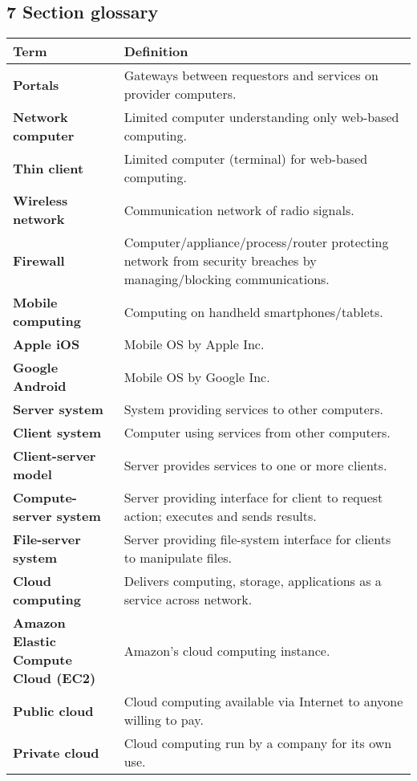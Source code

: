 \documentclass{article}
\begin{document}
\subsection*{7 Section glossary}
\centering
\begin{tabular}{>{\raggedright}p{} >{\raggedright\arraybackslash}p{}}
\toprule
\textbf{Term} & \textbf{Definition} \\
\midrule
\textbf{Portals} & Gateways between requestors and services on provider computers. \\
\textbf{Network computer} & Limited computer understanding only web-based computing. \\
\textbf{Thin client} & Limited computer (terminal) for web-based computing. \\
\textbf{Wireless network} & Communication network of radio signals. \\
\textbf{Firewall} & Computer/appliance/process/router protecting network from security breaches by managing/blocking communications. \\
\textbf{Mobile computing} & Computing on handheld smartphones/tablets. \\
\textbf{Apple iOS} & Mobile OS by Apple Inc. \\
\textbf{Google Android} & Mobile OS by Google Inc. \\
\textbf{Server system} & System providing services to other computers. \\
\textbf{Client system} & Computer using services from other computers. \\
\textbf{Client-server model} & Server provides services to one or more clients. \\
\textbf{Compute-server system} & Server providing interface for client to request action; executes and sends results. \\
\textbf{File-server system} & Server providing file-system interface for clients to manipulate files. \\
\textbf{Cloud computing} & Delivers computing, storage, applications as a service across network. \\
\textbf{Amazon Elastic Compute Cloud (EC2)} & Amazon's cloud computing instance. \\
\textbf{Public cloud} & Cloud computing available via Internet to anyone willing to pay. \\
\textbf{Private cloud} & Cloud computing run by a company for its own use. \\

\end{tabular}
\end{document}

